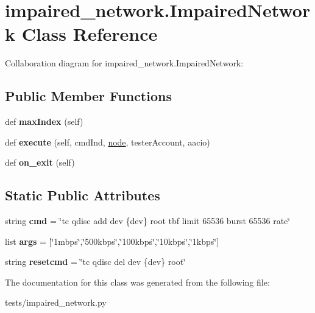 \hypertarget{classimpaired__network_1_1_impaired_network}{}\section{impaired\+\_\+network.\+Impaired\+Network Class Reference}
\label{classimpaired__network_1_1_impaired_network}


Collaboration diagram for impaired\+\_\+network.\+Impaired\+Network\+:
\subsection*{Public Member Functions}
\begin{DoxyCompactItemize}
\item 
\mbox{\label{classimpaired__network_1_1_impaired_network_a46f22d3988c0f2691f42065e01ba95fa}} 
def {\bfseries max\+Index} (self)
\item 
\mbox{\label{classimpaired__network_1_1_impaired_network_ae4899db615db9e9bace2bb2400dfda40}} 
def {\bfseries execute} (self, cmd\+Ind, \mbox{\hyperlink{structnode}{node}}, tester\+Account, aacio)
\item 
\mbox{\label{classimpaired__network_1_1_impaired_network_a017d9d34dd0df35d30a7b43a67250e4e}} 
def {\bfseries on\+\_\+exit} (self)
\end{DoxyCompactItemize}
\subsection*{Static Public Attributes}
\begin{DoxyCompactItemize}
\item 
\mbox{\label{classimpaired__network_1_1_impaired_network_a45711aa5095b799f9b6b200ba86e93c2}} 
string {\bfseries cmd} = \char`\"{}tc qdisc add dev \{dev\} root tbf limit 65536 burst 65536 rate\char`\"{}
\item 
\mbox{\label{classimpaired__network_1_1_impaired_network_a571108f9caa88c3520d194679475e5aa}} 
list {\bfseries args} = \mbox{[}\char`\"{}1mbps\char`\"{},\char`\"{}500kbps\char`\"{},\char`\"{}100kbps\char`\"{},\char`\"{}10kbps\char`\"{},\char`\"{}1kbps\char`\"{}\mbox{]}
\item 
\mbox{\label{classimpaired__network_1_1_impaired_network_af44bbcd7edbdfd714d6c58a422dee146}} 
string {\bfseries resetcmd} = \char`\"{}tc qdisc del dev \{dev\} root\char`\"{}
\end{DoxyCompactItemize}


The documentation for this class was generated from the following file\+:\begin{DoxyCompactItemize}
\item 
tests/impaired\+\_\+network.\+py\end{DoxyCompactItemize}
